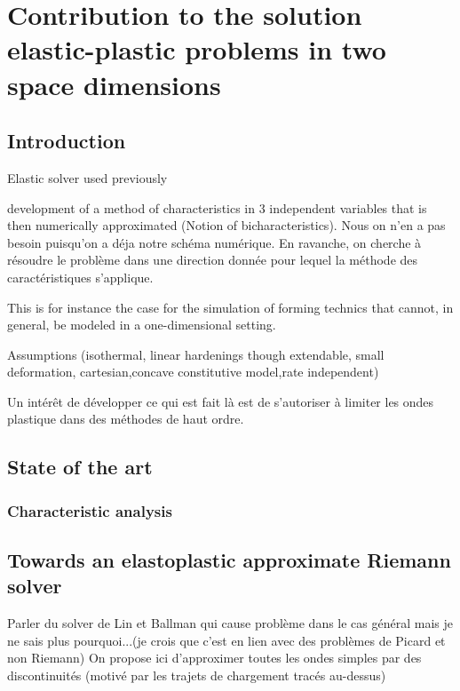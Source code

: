 \chapter{Contribution to the solution elastic-plastic problems in two space dimensions}

\section*{Introduction}
Elastic solver used previously

\cite{Clifton_thesis} development of a method of characteristics in 3 independent variables that is then numerically approximated (Notion of bicharacteristics). Nous on n'en a pas besoin puisqu'on a déja notre schéma numérique. En ravanche, on cherche à résoudre le problème dans une direction donnée pour lequel la méthode des caractéristiques s'applique.

This is for instance the case for the simulation of forming technics that cannot, in general, be modeled in a one-dimensional setting.

Assumptions (isothermal, linear hardenings though extendable, small deformation, cartesian,concave constitutive model,rate independent)

Un intérêt de développer ce qui est fait là est de s'autoriser à limiter les ondes plastique dans des méthodes de haut ordre.
\section{State of the art}


\subsection{Characteristic analysis}



\section{Towards an elastoplastic approximate Riemann solver}
Parler du solver de Lin et Ballman qui cause problème dans le cas général mais je ne sais plus pourquoi...(je crois que c'est en lien avec des problèmes de Picard et non Riemann)
On propose ici d'approximer toutes les ondes simples par des discontinuités (motivé par les trajets de chargement tracés au-dessus)
\cite{Lin_et_Ballman}
